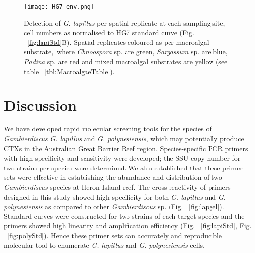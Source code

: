\documentclass[12pt]{article}
\begin{document}
\FloatBarrier 
\begin{figure} 
\texttt{[image: HG7-env.png]} 
\caption{Detection of \emph{G. lapillus} per spatial replicate at each sampling site, cell numbers as normalised to HG7 standard curve (Fig. ~\ref{fig:lapiStd}B). Spatial replicates coloured as per macroalgal substrate,\ where \emph{Chnoospora} sp. are green, \emph{Sargassum} sp. are blue, \emph{Padina} sp. are red and mixed macroalgal substrates are yellow (see table ~\ref{tbl:MacroalgaeTable}).} 
\label{fig:envHG7}
\end{figure} 
\FloatBarrier

\newpage
\section{Discussion}
We have developed rapid molecular screening tools for the species of \emph{Gambierdiscus} \emph{G. lapillus} and \emph{G. polynesiensis}, which may potentially produce CTXs in the Australian Great Barrier Reef region.
Species-specific PCR primers with high specificity and sensitivity were developed; the SSU copy number for two strains per species were determined. We also established that these primer sets were effective in establishing the abundance and distribution of two \emph{Gambierdiscus} species at Heron Island reef. The cross-reactivity of primers designed in this study showed high specificity for both \emph{G. lapillus} and \emph{G. polynesiensis} as compared to other \emph{Gambierdiscus} sp. (Fig. ~\ref{fig:lapgel}).
Standard curves were constructed for two strains of each target species and the primers showed high linearity and amplification efficiency (Fig. ~\ref{fig:lapiStd}, Fig. ~\ref{fig:polyStd}). Hence these primer sets can accurately and reproducible molecular tool to enumerate \emph{G. lapillus} and \emph{G. polynesiensis} cells.\\
\end{document}
